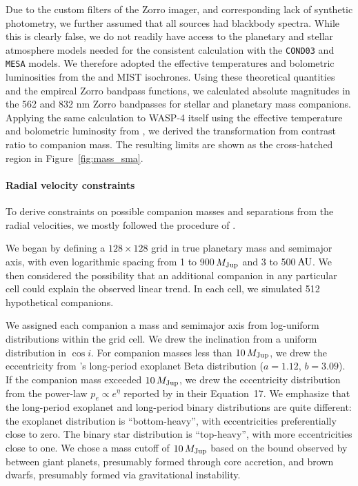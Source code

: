 \documentclass[12pt,twocolumn,tighten]{aastex62}
\begin{document}
Due to the custom filters of the Zorro imager, and corresponding lack
of synthetic photometry, we further assumed that all sources had
blackbody spectra. While this is clearly false, we do not readily have
access to the planetary and stellar atmosphere models needed for the
consistent calculation with the \texttt{COND03} and \texttt{MESA}
models.  We therefore adopted the effective temperatures and
bolometric luminosities from the \citet{baraffe_evolutionary_2003} and
MIST isochrones.  Using these theoretical quantities and the empircal
Zorro bandpass functions, we calculated absolute magnitudes in the 562
and 832 nm Zorro bandpasses for stellar and planetary mass companions.
Applying the same calculation to WASP-4 itself using the effective
temperature and bolometric luminosity from
, we derived the transformation from
contrast ratio to companion mass.  The resulting limits are shown as
the cross-hatched region in Figure~\ref{fig:mass_sma}.


\paragraph{Radial velocity constraints}

To derive constraints on possible companion masses and separations
from the radial velocities, we mostly followed the procedure of
\citet{bryan_excess_2019}. 

We began by defining a $128\times128$ grid in true planetary mass and
semimajor axis, with even logarithmic spacing from 1 to 900$\,$$M_{\rm
Jup}$ and 3 to 500$\,$${\rm AU}$.  We then considered the possibility
that an additional companion in any particular cell could explain the
observed linear trend.  In each cell, we simulated 512 hypothetical
companions.

We assigned each companion a mass and semimajor axis from log-uniform
distributions within the grid cell. We drew the inclination from a
uniform distribution in $\cos i$.  For companion masses less than
$10\,M_{\rm Jup}$, we drew the eccentricity from
\citet{kipping_beta_2013}'s long-period exoplanet Beta distribution
($a=1.12$, $b=3.09$).  If the companion mass exceeded $10\,M_{\rm
Jup}$, we drew the eccentricity distribution from the power-law $p_e
\propto e^\eta$ reported by \citet{moe_mind_2017} in their
Equation~17.  We emphasize that the long-period exoplanet and
long-period binary distributions are quite different: the exoplanet
distribution is ``bottom-heavy'', with eccentricities preferentially
close to zero. The binary star distribution is ``top-heavy'', with
more eccentricities close to one.  We chose a mass cutoff of
$10\,M_{\rm Jup}$ based on the bound observed by
\citet{schlaufman_evidence_2018} between giant planets, presumably
formed through core accretion, and brown dwarfs, presumably formed via
gravitational instability.
\end{document}
